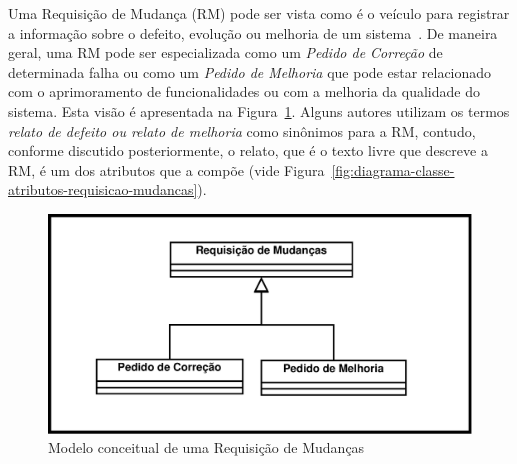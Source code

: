 


Uma Requisição de Mudança (RM) pode ser vista como é o veículo para registrar a
informação sobre o defeito, evolução ou melhoria de um
sistema~\cite{tripathy2014software}. De maneira geral, uma RM pode ser
especializada como um \textit{Pedido de Correção} de determinada falha ou como
um \textit{Pedido de Melhoria} que pode estar relacionado com o aprimoramento de
funcionalidades ou com a melhoria da qualidade do sistema. Esta visão é
apresentada na Figura~\ref{fig:diagrama-classe-requisicao-mudancas}. Alguns
autores utilizam os termos \textit{relato de defeito ou relato de melhoria} como
sinônimos para a RM, contudo, conforme discutido posteriormente, o relato, que é
o texto livre que descreve a RM, é um dos atributos que a compõe (vide
Figura~\ref{fig:diagrama-classe-atributos-requisicao-mudancas}).

\begin{figure}[htpb]
	\centering
	\includegraphics[width=0.8\linewidth]{./chapter-manutencao-software-visao-geral/img/diagrama-classe-conceitual-requisicao-mudancas.pdf}
	\caption{Modelo conceitual de uma Requisição de Mudanças}
	\label{fig:diagrama-classe-requisicao-mudancas}
\end{figure}
\todoend

